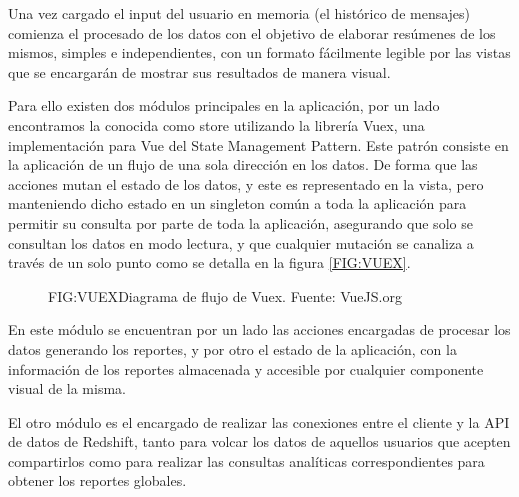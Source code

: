

Una vez cargado el input del usuario en memoria (el histórico de mensajes) comienza el procesado de los datos con el objetivo de elaborar resúmenes de los mismos, simples e independientes, con un formato fácilmente legible por las vistas que se encargarán de mostrar sus resultados de manera visual.

Para ello existen dos módulos principales en la aplicación, por un lado encontramos la conocida como store utilizando la librería Vuex, una implementación para Vue del State Management Pattern\cite{VueJS}. Este patrón consiste en la aplicación de un flujo de una sola dirección en los datos. De forma que las acciones mutan el estado de los datos, y este es representado en la vista, pero manteniendo dicho estado en un singleton común a toda la aplicación para permitir su consulta por parte de toda la aplicación, asegurando que solo se consultan los datos en modo lectura, y que cualquier mutación se canaliza a través de un solo punto como se detalla en la figura \ref{FIG:VUEX}.

\begin{figure}[Diagrama de flujo de Vuex]{FIG:VUEX}{Diagrama de flujo de Vuex. Fuente: VueJS.org}
\end{figure}

En este módulo se encuentran por un lado las acciones encargadas de procesar los datos generando los reportes, y por otro el estado de la aplicación, con la información de los reportes almacenada y accesible por cualquier componente visual de la misma.

El otro módulo es el encargado de realizar las conexiones entre el cliente y la API de datos de Redshift, tanto para volcar los datos de aquellos usuarios que acepten compartirlos como para realizar las consultas analíticas correspondientes para obtener los reportes globales.
